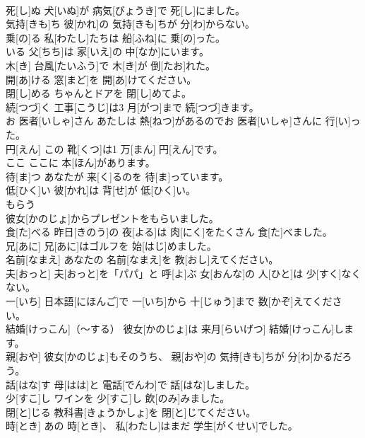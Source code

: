 \documentclass[8pt]{extreport}
\begin{document}
\begin{CJK}{UTF8}{min}
\\	死[し]ぬ	犬[いぬ]が 病気[びょうき]で 死[し]にました。		
\\	気持[きも]ち	彼[かれ]の 気持[きも]ちが 分[わ]からない。		
\\	乗[の]る	私[わたし]たちは 船[ふね]に 乗[の]った。		
\\	いる	父[ちち]は 家[いえ]の 中[なか]にいます。		
\\	木[き]	台風[たいふう]で 木[き]が 倒[たお]れた。		
\\	開[あ]ける	窓[まど]を 開[あ]けてください。		
\\	閉[し]める	ちゃんとドアを 閉[し]めてよ。		
\\	続[つづ]く	工事[こうじ]は3 月[がつ]まで 続[つづ]きます。		
\\	お 医者[いしゃ]さん	あたしは 熱[ねつ]があるのでお 医者[いしゃ]さんに 行[い]った。		
\\	円[えん]	この 靴[くつ]は1 万[まん] 円[えん]です。		
\\	ここ	ここに 本[ほん]があります。		
\\	待[ま]つ	あなたが 来[く]るのを 待[ま]っています。		
\\	低[ひく]い	彼[かれ]は 背[せ]が 低[ひく]い。		
\\	もらう
\\	彼女[かのじょ]からプレゼントをもらいました。		
\\	食[た]べる	昨日[きのう]の 夜[よる]は 肉[にく]をたくさん 食[た]べました。		
\\	兄[あに]	兄[あに]はゴルフを 始[はじ]めました。		
\\	名前[なまえ]	あなたの 名前[なまえ]を 教[おし]えてください。		
\\	夫[おっと]	夫[おっと]を「パパ」と 呼[よ]ぶ 女[おんな]の 人[ひと]は 少[すく]なくない。		
\\	一[いち]	日本語[にほんご]で 一[いち]から 十[じゅう]まで 数[かぞ]えてください。		
\\	結婚[けっこん]（～する）	彼女[かのじょ]は 来月[らいげつ] 結婚[けっこん]します。		
\\	親[おや]	彼女[かのじょ]もそのうち、 親[おや]の 気持[きも]ちが 分[わ]かるだろう。		
\\	話[はな]す	母[はは]と 電話[でんわ]で 話[はな]しました。		
\\	少[すこ]し	ワインを 少[すこ]し 飲[のみ]みました。		
\\	閉[と]じる	教科書[きょうかしょ]を 閉[と]じてください。		
\\	時[とき]	あの 時[とき]、 私[わたし]はまだ 学生[がくせい]でした。		

\end{CJK}
\end{document}
